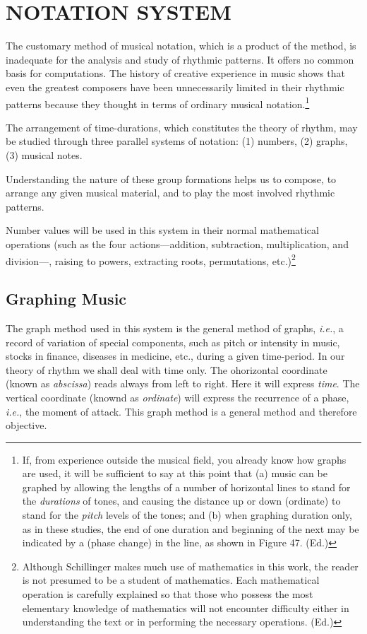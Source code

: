 
\chapter{NOTATION SYSTEM}

The customary method of musical notation, which is a product of the  method, is inadequate for the analysis and study of rhythmic patterns. It offers no common basis for computations. The history of creative experience in music shows that even the greatest composers have been unnecessarily limited in their rhythmic patterns because they thought in terms of ordinary musical notation.\footnote{If, from experience outside the musical field, you already know how graphs are used, it will be sufficient to say at this point that (a) music can be graphed by allowing the lengths of a number of horizontal lines to stand for the \textit{durations} of tones, and causing the distance up or down (ordinate) to stand for the \textit{pitch} levels of the tones; and (b) when graphing duration only, as in these studies, the end of one duration and beginning of the next may be indicated by a  (phase change) in the line, as shown in Figure 47. (Ed.)}

The arrangement of time-durations, which constitutes the theory of rhythm, may be studied through three parallel systems of notation: (1) numbers, (2) graphs, (3) musical notes.

Understanding the nature of these group formations helps us to compose, to arrange any given musical material, and to play the most involved rhythmic patterns.

Number values will be used in this system in their normal mathematical operations (such as the four actions---addition, subtraction, multiplication, and division---, raising to powers, extracting roots, permutations, etc.)\footnote{Although Schillinger makes much use of mathematics in this work, the reader is not presumed to be a student of mathematics. Each mathematical operation is carefully explained so that those who possess the most elementary knowledge of mathematics will not encounter difficulty either in understanding the text or in performing the necessary operations. (Ed.)}

\section{Graphing Music}

The graph method used in this system is the general method of graphs, \textit{i.e.}, a record of variation of special components, such as pitch or intensity in music, stocks in finance, diseases in medicine, etc., during a given time-period. In our theory of rhythm we shall deal with time only. The ohorizontal coordinate (known as \textit{abscissa}) reads always from left to right. Here it will express \textit{time}. The vertical coordinate (knownd as \textit{ordinate}) will express the recurrence of a phase, \textit{i.e.}, the moment of attack. This graph method is a general method and therefore objective.

